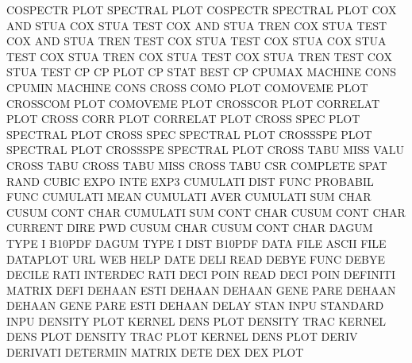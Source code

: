 COSPECTR PLOT                           SPECTRAL PLOT
COSPECTR                                SPECTRAL PLOT
COX      AND  STUA                      COX      STUA TEST
COX      AND  STUA TREN                 COX      STUA TEST
COX      AND  STUA TREN TEST            COX      STUA TEST
COX      STUA                           COX      STUA TEST
COX      STUA TREN                      COX      STUA TEST
COX      STUA TREN TEST                 COX      STUA TEST
CP                                      CP       PLOT
CP       STAT                           BEST     CP
CPUMAX                                  MACHINE  CONS
CPUMIN                                  MACHINE  CONS
CROSS    COMO PLOT                      COMOVEME PLOT
CROSSCOM PLOT                           COMOVEME PLOT
CROSSCOR PLOT                           CORRELAT PLOT
CROSS    CORR PLOT                      CORRELAT PLOT
CROSS    SPEC PLOT                      SPECTRAL PLOT
CROSS    SPEC                           SPECTRAL PLOT
CROSSSPE PLOT                           SPECTRAL PLOT
CROSSSPE                                SPECTRAL PLOT
CROSS    TABU MISS VALU                 CROSS    TABU
CROSS    TABU MISS                      CROSS    TABU
CSR                                     COMPLETE SPAT RAND
CUBIC    EXPO INTE                      EXP3
CUMULATI DIST FUNC                      PROBABIL FUNC
CUMULATI MEAN                           CUMULATI AVER
CUMULATI SUM  CHAR                      CUSUM    CONT CHAR
CUMULATI SUM  CONT CHAR                 CUSUM    CONT CHAR
CURRENT  DIRE                           PWD
CUSUM    CHAR                           CUSUM    CONT CHAR
DAGUM    TYPE I                         B10PDF
DAGUM    TYPE I    DIST                 B10PDF
DATA     FILE                           ASCII    FILE
DATAPLOT URL                            WEB      HELP
DATE     DELI                           READ
DEBYE    FUNC                           DEBYE
DECILE   RATI                           INTERDEC RATI
DECI     POIN                           READ     DECI POIN 
DEFINITI                                MATRIX   DEFI
DEHAAN   ESTI                           DEHAAN
DEHAAN   GENE PARE                      DEHAAN
DEHAAN   GENE PARE ESTI                 DEHAAN
DELAY    STAN INPU                      STANDARD INPU
DENSITY  PLOT                           KERNEL   DENS PLOT
DENSITY  TRAC                           KERNEL   DENS PLOT
DENSITY  TRAC PLOT                      KERNEL   DENS PLOT
DERIV                                   DERIVATI
DETERMIN                                MATRIX   DETE
DEX                                     DEX      PLOT
